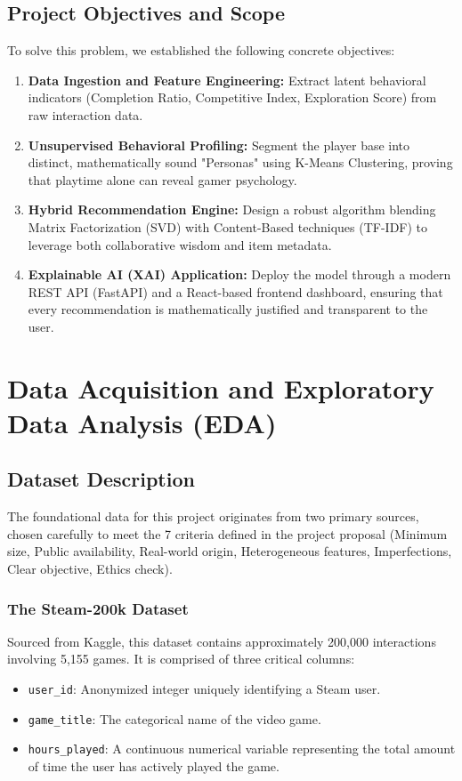 \documentclass[12pt, a4paper]{report}
\begin{document}
\section{Project Objectives and Scope}
To solve this problem, we established the following concrete objectives:
\begin{enumerate}
    \item \textbf{Data Ingestion and Feature Engineering:} Extract latent behavioral indicators (Completion Ratio, Competitive Index, Exploration Score) from raw interaction data.
    \item \textbf{Unsupervised Behavioral Profiling:} Segment the player base into distinct, mathematically sound "Personas" using K-Means Clustering, proving that playtime alone can reveal gamer psychology.
    \item \textbf{Hybrid Recommendation Engine:} Design a robust algorithm blending Matrix Factorization (SVD) with Content-Based techniques (TF-IDF) to leverage both collaborative wisdom and item metadata.
    \item \textbf{Explainable AI (XAI) Application:} Deploy the model through a modern REST API (FastAPI) and a React-based frontend dashboard, ensuring that every recommendation is mathematically justified and transparent to the user.
\end{enumerate}

\chapter{Data Acquisition and Exploratory Data Analysis (EDA)}
\section{Dataset Description}
The foundational data for this project originates from two primary sources, chosen carefully to meet the 7 criteria defined in the project proposal (Minimum size, Public availability, Real-world origin, Heterogeneous features, Imperfections, Clear objective, Ethics check).

\subsection{The Steam-200k Dataset}
Sourced from Kaggle, this dataset contains approximately 200,000 interactions involving 5,155 games. It is comprised of three critical columns:
\begin{itemize}
    \item \texttt{user\_id}: Anonymized integer uniquely identifying a Steam user.
    \item \texttt{game\_title}: The categorical name of the video game.
    \item \texttt{hours\_played}: A continuous numerical variable representing the total amount of time the user has actively played the game.
\end{itemize}
\end{document}
